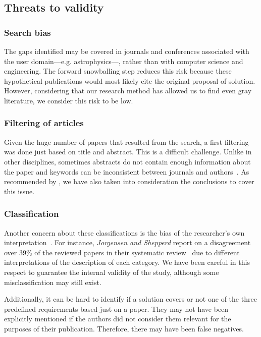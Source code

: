 \subsection{Threats to validity}
\label{sec:mapping/threats}
\subsubsection{Search bias}
The gaps identified may be covered in
journals and conferences associated with the user domain---e.g. astrophysics---,
rather than with computer science and engineering. The forward snowballing
step reduces this risk because these hypothetical publications would most likely
cite the original proposal of solution. However, considering that our research method has
allowed us to find even gray literature, we consider this risk to be low.

\subsubsection{Filtering of articles}
Given the huge number of papers that resulted from the search,
a first filtering was done just based on title and abstract.
This is a difficult challenge. Unlike in other disciplines, sometimes abstracts
do not contain enough information about the paper and keywords can be inconsistent
between journals and authors~\cite{Budgen2008,Brereton2007,Jalali2012}.
As recommended by \cite{Brereton2007}, we have also taken into consideration
the conclusions to cover this issue.

\subsubsection{Classification}
Another concern about these classifications is the bias of the researcher's own
interpretation~\cite{MacLure2005}.
For instance, \emph{Jorgensen and Shepperd} report on a disagreement over
39\% of the reviewed papers in their systematic review~\cite{Jorgensen2007}
due to different interpretations of the description of each category. We
have been careful in this respect to guarantee the internal validity of the
study, although some misclassification may still exist.

Additionally, it can be hard to identify if a solution covers or not one of the
three predefined requirements based just on a paper. They may not have been
explicitly mentioned if the authors did not consider them relevant for the
purposes of their publication. Therefore, there may have been false negatives.

